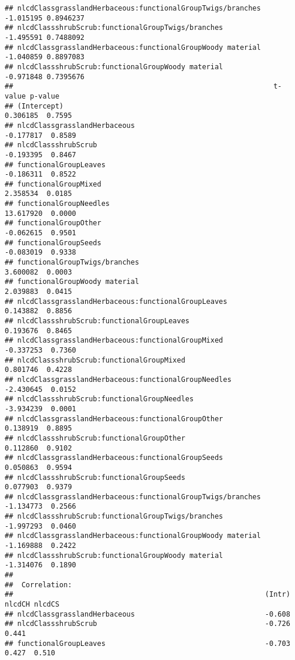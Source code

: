 \documentclass[]{article}
\begin{document}
\begin{verbatim}
## nlcdClassgrasslandHerbaceous:functionalGroupTwigs/branches -1.015195 0.8946237
## nlcdClassshrubScrub:functionalGroupTwigs/branches          -1.495591 0.7488092
## nlcdClassgrasslandHerbaceous:functionalGroupWoody material -1.040859 0.8897083
## nlcdClassshrubScrub:functionalGroupWoody material          -0.971848 0.7395676
##                                                              t-value p-value
## (Intercept)                                                 0.306185  0.7595
## nlcdClassgrasslandHerbaceous                               -0.177817  0.8589
## nlcdClassshrubScrub                                        -0.193395  0.8467
## functionalGroupLeaves                                      -0.186311  0.8522
## functionalGroupMixed                                        2.358534  0.0185
## functionalGroupNeedles                                     13.617920  0.0000
## functionalGroupOther                                       -0.062615  0.9501
## functionalGroupSeeds                                       -0.083019  0.9338
## functionalGroupTwigs/branches                               3.600082  0.0003
## functionalGroupWoody material                               2.039883  0.0415
## nlcdClassgrasslandHerbaceous:functionalGroupLeaves          0.143882  0.8856
## nlcdClassshrubScrub:functionalGroupLeaves                   0.193676  0.8465
## nlcdClassgrasslandHerbaceous:functionalGroupMixed          -0.337253  0.7360
## nlcdClassshrubScrub:functionalGroupMixed                    0.801746  0.4228
## nlcdClassgrasslandHerbaceous:functionalGroupNeedles        -2.430645  0.0152
## nlcdClassshrubScrub:functionalGroupNeedles                 -3.934239  0.0001
## nlcdClassgrasslandHerbaceous:functionalGroupOther           0.138919  0.8895
## nlcdClassshrubScrub:functionalGroupOther                    0.112860  0.9102
## nlcdClassgrasslandHerbaceous:functionalGroupSeeds           0.050863  0.9594
## nlcdClassshrubScrub:functionalGroupSeeds                    0.077903  0.9379
## nlcdClassgrasslandHerbaceous:functionalGroupTwigs/branches -1.134773  0.2566
## nlcdClassshrubScrub:functionalGroupTwigs/branches          -1.997293  0.0460
## nlcdClassgrasslandHerbaceous:functionalGroupWoody material -1.169888  0.2422
## nlcdClassshrubScrub:functionalGroupWoody material          -1.314076  0.1890
## 
##  Correlation: 
##                                                            (Intr) nlcdCH nlcdCS
## nlcdClassgrasslandHerbaceous                               -0.608              
## nlcdClassshrubScrub                                        -0.726  0.441       
## functionalGroupLeaves                                      -0.703  0.427  0.510

\end{verbatim}
\end{document}
